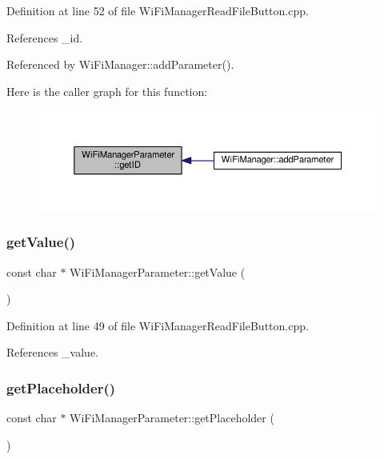 Definition at line 52 of file Wi\+Fi\+Manager\+Read\+File\+Button.\+cpp.



References \+\_\+id.



Referenced by Wi\+Fi\+Manager\+::add\+Parameter().

Here is the caller graph for this function\+:\nopagebreak
\begin{figure}[H]
\begin{center}
\leavevmode
\includegraphics[width=350pt]{d7/d08/class_wi_fi_manager_parameter_af57919615418fff788310ba9cc2664d8_icgraph}
\end{center}
\end{figure}
\mbox{\label{class_wi_fi_manager_parameter_a23d23709f466ef1c3c2535a39016ec0f}} 
\subsubsection{\texorpdfstring{get\+Value()}{getValue()}}
{\footnotesize\ttfamily const char $\ast$ Wi\+Fi\+Manager\+Parameter\+::get\+Value (\begin{DoxyParamCaption}{ }\end{DoxyParamCaption})}



Definition at line 49 of file Wi\+Fi\+Manager\+Read\+File\+Button.\+cpp.



References \+\_\+value.

\mbox{\label{class_wi_fi_manager_parameter_a69124c6f46876d1ede54177c692e3382}} 
\subsubsection{\texorpdfstring{get\+Placeholder()}{getPlaceholder()}}
{\footnotesize\ttfamily const char $\ast$ Wi\+Fi\+Manager\+Parameter\+::get\+Placeholder (\begin{DoxyParamCaption}{ }\end{DoxyParamCaption})}



